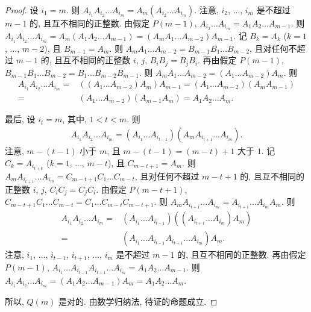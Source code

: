 \documentclass[../libro.tex]{subfiles}
\begin{document}
\begin{proof}
    设 \(i_1 = m\).
    则 \(A_{i_1} A_{i_2} \dots A_{i_m}
    = A_{m} (A_{i_2} \dots A_{i_m})\).
    注意, \(i_2\), \(\dots\), \(i_m\)
    是不超过 \(m-1\) 的, 且互不相同的正整数.
    由假定 \(P(m-1)\),
    \(A_{i_2} \dots A_{i_m} = A_1 A_2 \dots A_{m-1}\).
    则 \(A_{i_1} A_{i_2} \dots A_{i_m}
        = A_{m} (A_1 A_2 \dots A_{m-1})
    = (A_{m} A_1 \dots A_{m-2}) A_{m-1}\).
    记 \(B_k = A_k\) (\(k = 1\), \(\dots\), \(m-2\)),
    且 \(B_{m-1} = A_{m}\).
    则 \(A_{m} A_1 \dots A_{m-2} = B_{m-1} B_1 \dots B_{m-2}\),
    且对任何不超过 \(m-1\) 的, 且互不相同的正整数 \(i\), \(j\),
    \(B_i B_j = B_j B_i\).
    再由假定 \(P(m-1)\),
    \(B_{m-1} B_1 \dots B_{m-2} = B_1 \dots B_{m-2} B_{m-1}\).
    则 \(A_{m} A_1 \dots A_{m-2} = (A_1 \dots A_{m-2}) A_{m}\).
    则
    \begin{align*}
        A_{i_1} A_{i_2} \dots A_{i_m}
        = {} & ((A_1 \dots A_{m-2}) A_{m}) A_{m-1}
        = (A_1 \dots A_{m-2}) (A_{m} A_{m-1})
        \\
        = {} & (A_1 \dots A_{m-2}) (A_{m-1} A_{m})
        = A_1 A_2 \dots A_m.
    \end{align*}

    最后, 设 \(i_t = m\), 其中, \(1 < t < m\).
    则
    \begin{align*}
        A_{i_1} A_{i_2} \dots A_{i_m}
        = (A_{i_1} \dots A_{i_{t-1}})
        (A_m A_{i_{t+1}} \dots A_{i_m}).
    \end{align*}
    注意, \(m - (t - 1)\) 小于 \(m\),
    且 \(m - (t - 1) = (m - t) + 1\) 大于 \(1\).
    记 \(C_k = A_{i_{t+k}}\) (\(k = 1\), \(\dots\), \(m-t\)),
    且 \(C_{m-t+1} = A_m\).
    则 \(A_m A_{i_{t+1}} \dots A_{i_m}
    = C_{m-t+1} C_1 \dots C_{m-t}\),
    且对任何不超过 \(m-t+1\) 的, 且互不相同的正整数 \(i\), \(j\),
    \(C_i C_j = C_j C_i\).
    由假定 \(P(m-t+1)\),
    \(C_{m-t+1} C_1 \dots C_{m-t} = C_1 \dots C_{m-t} C_{m-t+1}\).
    则 \(A_m A_{i_{t+1}} \dots A_{i_m}
    = A_{i_{t+1}} \dots A_{i_m} A_m\).
    则
    \begin{align*}
        A_{i_1} A_{i_2} \dots A_{i_m}
        = {} &
        (A_{i_1} \dots A_{i_{t-1}})
        ((A_{i_{t+1}} \dots A_{i_m}) A_m)
        \\
        = {} &
        (A_{i_1} \dots A_{i_{t-1}} A_{i_{t+1}} \dots A_{i_m})
        A_m.
    \end{align*}
    注意, \(i_1\), \(\dots\), \(i_{t-1}\),
    \(i_{t+1}\), \(\dots\), \(i_m\)
    是不超过 \(m-1\) 的, 且互不相同的正整数.
    再由假定 \(P(m-1)\),
    \(A_{i_1} \dots A_{i_{t-1}} A_{i_{t+1}} \dots A_{i_m}
    = A_1 A_2 \dots A_{m-1}\).
    则
    \(A_{i_1} A_{i_2} \dots A_{i_m}
        = (A_1 A_2 \dots A_{m-1}) A_{m}
    = A_1 A_2 \dots A_{m}\).

    所以, \(Q(m)\) 是对的.
    由数学归纳法, 待证的命题成立.
\end{proof}
\end{document}
